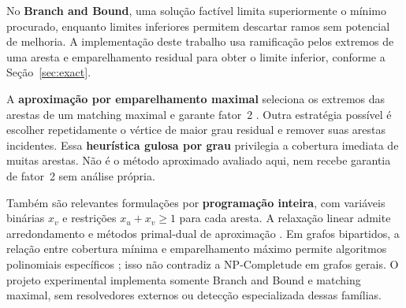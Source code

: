 No \textbf{Branch and Bound}, uma solução factível limita superiormente
o mínimo procurado, enquanto limites inferiores permitem descartar
ramos sem potencial de melhoria. A implementação deste trabalho usa
ramificação pelos extremos de uma aresta e emparelhamento residual
para obter o limite inferior, conforme a Seção~\ref{sec:exact}.

A \textbf{aproximação por emparelhamento maximal} seleciona os extremos
das arestas de um matching maximal e garante fator~2
\cite{cormen2022,vazirani2001}. Outra estratégia possível é escolher
repetidamente o vértice de maior grau residual e remover suas arestas
incidentes. Essa \textbf{heurística gulosa por grau} privilegia a
cobertura imediata de muitas arestas. Não é o método aproximado
avaliado aqui, nem recebe garantia de fator~2 sem análise própria.

Também são relevantes formulações por \textbf{programação inteira},
com variáveis binárias $x_v$ e restrições $x_u+x_v\geq 1$ para cada
aresta. A relaxação linear admite arredondamento e métodos
primal-dual de aproximação \cite{vazirani2001}. Em grafos bipartidos,
a relação entre cobertura mínima e emparelhamento máximo permite
algoritmos polinomiais específicos \cite{cormen2022}; isso não
contradiz a NP-Completude em grafos gerais. O projeto experimental
implementa somente Branch and Bound e matching maximal, sem
resolvedores externos ou detecção especializada dessas famílias.
